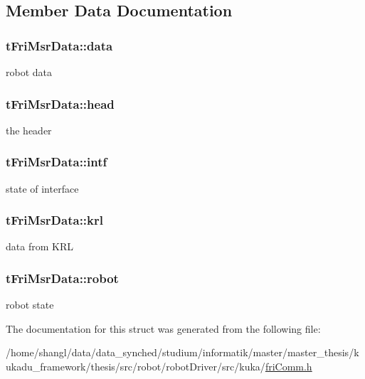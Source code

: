 \subsection{\-Member \-Data \-Documentation}
\hypertarget{structtFriMsrData_a051008bb4f37efc95dadb2a723641401}{
\subsubsection[{data}]{ {\bf t\-Fri\-Msr\-Data\-::data}}}\label{structtFriMsrData_a051008bb4f37efc95dadb2a723641401}
robot data \hypertarget{structtFriMsrData_aa238c9c08bac43877e4775b1dd6ece81}{
\subsubsection[{head}]{ {\bf t\-Fri\-Msr\-Data\-::head}}}\label{structtFriMsrData_aa238c9c08bac43877e4775b1dd6ece81}
the header \hypertarget{structtFriMsrData_a860e45b85966489f6503a2d613c58206}{
\subsubsection[{intf}]{ {\bf t\-Fri\-Msr\-Data\-::intf}}}\label{structtFriMsrData_a860e45b85966489f6503a2d613c58206}
state of interface \hypertarget{structtFriMsrData_a8bbe1d55480dbbe23097b0996ea9569b}{
\subsubsection[{krl}]{ {\bf t\-Fri\-Msr\-Data\-::krl}}}\label{structtFriMsrData_a8bbe1d55480dbbe23097b0996ea9569b}
data from \-K\-R\-L \hypertarget{structtFriMsrData_aa76db4b0dacb1075ebf3d9f3d1e3e214}{
\subsubsection[{robot}]{ {\bf t\-Fri\-Msr\-Data\-::robot}}}\label{structtFriMsrData_aa76db4b0dacb1075ebf3d9f3d1e3e214}
robot state 

\-The documentation for this struct was generated from the following file\-:\begin{DoxyCompactItemize}
\item 
/home/shangl/data/data\-\_\-synched/studium/informatik/master/master\-\_\-thesis/kukadu\-\_\-framework/thesis/src/robot/robot\-Driver/src/kuka/\hyperlink{friComm_8h}{fri\-Comm.\-h}\end{DoxyCompactItemize}
